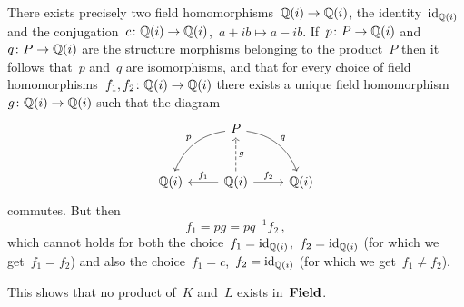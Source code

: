 There exists precisely two field homomorphisms~$\mathbb{Q}(i) \to \mathbb{Q}(i)$, the identity~$\operatorname{id}_{\mathbb{Q}(i)}$ and the conjugation~$c \colon \mathbb{Q}(i) \to \mathbb{Q}(i)$,~$a + ib \mapsto a - ib$.
If~$p \colon P \to \mathbb{Q}(i)$ and~$q \colon P \to \mathbb{Q}(i)$ are the structure morphisms belonging to the product~$P$ then it follows that~$p$ and~$q$ are isomorphisms, and that for every choice of field homomorphisms~$f_1, f_2 \colon \mathbb{Q}(i) \to \mathbb{Q}(i)$ there exists a unique field homomorphism~$g \colon \mathbb{Q}(i) \to \mathbb{Q}(i)$ such that the diagram
\[
  \begin{tikzcd}[row sep = large]
      {}
    & P
      \arrow[bend right]{dl}[above left]{p}
      \arrow[bend left]{dr}[above right]{q}
    & {}
    \\
      \Rational(i)
    & \Rational(i)
      \arrow[dashed]{u}[right]{g}
      \arrow{l}[above]{f_1}
      \arrow{r}[above]{f_2}
    & \Rational(i)
  \end{tikzcd}
\]
commutes.
But then
\[
    f_1
  = p g
  = p q^{-1} f_2 \,,
\]
which cannot holds for both the choice~$f_1 = \operatorname{id}_{\mathbb{Q}(i)}$,~$f_2 = \operatorname{id}_{\mathbb{Q}(i)}$ (for which we get~$f_1 = f_2$) and also the choice~$f_1 = c$,~$f_2 = \operatorname{id}_{\mathbb{Q}(i)}$ (for which we get~$f_1 \neq f_2$).

This shows that no product of~$K$ and~$L$ exists in~$\mathbf{Field}$.




